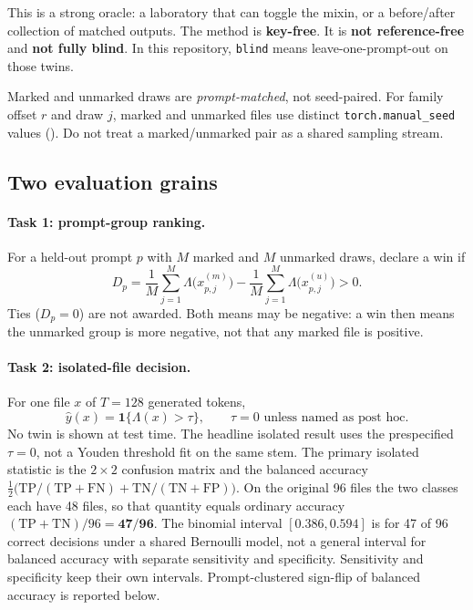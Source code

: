 \documentclass[11pt,a4paper]{article}
\theoremstyle{definition}
\newcommand{\LLR}{\Lambda}
\begin{document}
This is a strong oracle: a laboratory that can toggle the mixin, or a
before/after collection of matched outputs. The method is
\textbf{key-free}. It is \textbf{not reference-free} and \textbf{not
fully blind}. In this repository, \texttt{blind} means
leave-one-prompt-out on those twins.

Marked and unmarked draws are \emph{prompt-matched}, not seed-paired.
For family offset $r$ and draw $j$, marked and unmarked files use
distinct \texttt{torch.manual\_seed} values
(). Do not treat a marked/unmarked pair as a
shared sampling stream.

\subsection{Two evaluation grains}

\paragraph{Task 1: prompt-group ranking.}
For a held-out prompt $p$ with $M$ marked and $M$ unmarked draws, declare
a win if
\begin{equation}
D_p
=
\frac{1}{M}\sum_{j=1}^{M} \LLR\bigl(x_{p,j}^{(m)}\bigr)
-
\frac{1}{M}\sum_{j=1}^{M} \LLR\bigl(x_{p,j}^{(u)}\bigr)
> 0.
\label{eq:ranking}
\end{equation}
Ties ($D_p=0$) are not awarded. Both means may be negative: a win then
means the unmarked group is more negative, not that any marked file is
positive.

\paragraph{Task 2: isolated-file decision.}
For one file $x$ of $T=128$ generated tokens,
\begin{equation}
\hat y(x) = \mathbf{1}\{\LLR(x)>\tau\},
\qquad \tau=0 \text{ unless named as post hoc.}
\label{eq:isolated}
\end{equation}
No twin is shown at test time. The headline isolated result uses the
prespecified $\tau=0$, not a Youden threshold \citep{youden1950index}
fit on the same stem. The primary isolated statistic is the $2\times 2$
confusion matrix and the balanced accuracy
$\tfrac12\bigl(\mathrm{TP}/(\mathrm{TP}+\mathrm{FN})+\mathrm{TN}/(\mathrm{TN}+\mathrm{FP})\bigr)$.
On the original 96 files the two classes each have 48 files, so that
quantity equals ordinary accuracy $({\mathrm{TP}}+{\mathrm{TN}})/96=\textbf{47/96}$.
The binomial interval $[0.386,0.594]$ is for 47 of 96 correct decisions
under a shared Bernoulli model, not a general interval for balanced
accuracy with separate sensitivity and specificity. Sensitivity and
specificity keep their own intervals. Prompt-clustered sign-flip of
balanced accuracy is reported below.
\end{document}
